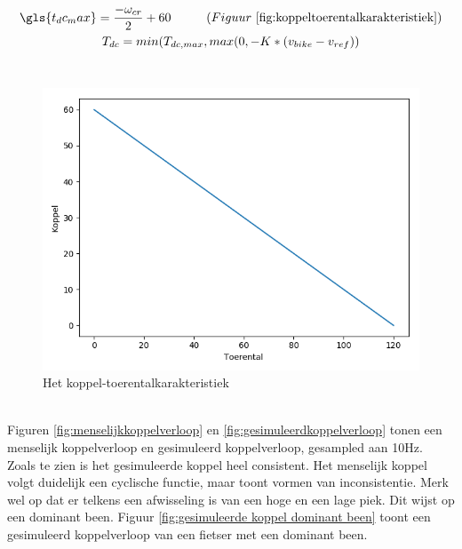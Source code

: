 \begin{gather*}
\gls{t_dc_max} = \frac{-\omega_{cr}}{2}+60 \tab (Figuur\ \ref{fig:koppeltoerentalkarakteristiek}) \\
T_{dc} = min(T_{dc,max},max(0,-K*(v_{bike}-v_{ref}))
\end{gather*}
\\
\begin{figure}
  \includegraphics[width=\linewidth]{images/koppel-toerentalkarakteristiek.png}
  \caption{Het koppel-toerentalkarakteristiek}
  \label{fig:koppeltoerentalkarakteristiek}
\end{figure}
\\
\noindent Figuren \ref{fig:menselijkkoppelverloop} en \ref{fig:gesimuleerdkoppelverloop} tonen een menselijk koppelverloop en gesimuleerd koppelverloop, gesampled aan 10Hz. Zoals te zien is het gesimuleerde koppel heel consistent. Het menselijk koppel volgt duidelijk een cyclische functie, maar toont vormen van inconsistentie. Merk wel op dat er telkens een afwisseling is van een hoge en een lage piek. Dit wijst op een dominant been. Figuur \ref{fig:gesimuleerde koppel dominant been} toont een gesimuleerd koppelverloop van een fietser met een dominant been.
\\\\
